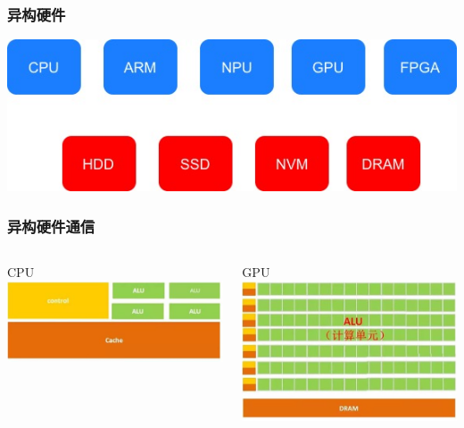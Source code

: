 \begin{frame}
\frametitle{异构硬件}
\centering	
\includegraphics[width=.75\textwidth]{fig23/os3.jpg}
\end{frame}


\begin{frame}
\frametitle{异构硬件通信}
\begin{columns}
		\begin{column}{.55\textwidth}
		\begin{block}{CPU}
			\includegraphics[width=\textwidth]{fig23/cpu.jpg}
		\end{block}
		\end{column}
		\begin{column}{.45\textwidth}
		\begin{block}{GPU}
			\includegraphics[width=1.\textwidth]{fig23/gpu.jpg}
		\end{block}
		\end{column}
\end{columns}
\end{frame}


